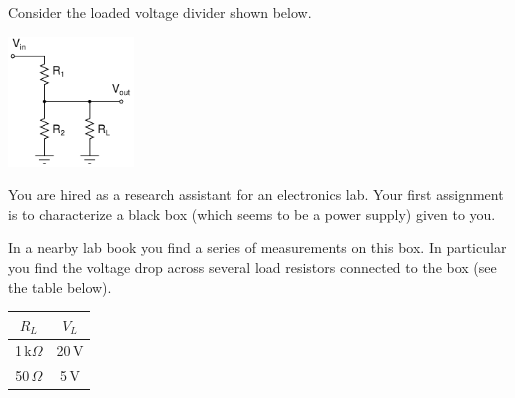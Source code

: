 \documentclass[letterpaper,addpoints,answers]{exam}
\begin{document}
\begin{questions}

\question

Consider the loaded voltage divider shown below.
\begin{center}
 \includegraphics[width=0.25\textwidth]{./schematics/loaded_voltage_divider}
\end{center}


\pagebreak

\question

You are hired as a research assistant for an electronics lab. Your first
assignment is to characterize a black box (which seems to be a power
supply) given to you.

In a nearby lab book you find a series of measurements on this box.
In particular you find the voltage drop across several load resistors
connected to the box (see the table below).

\begin{center}
 \begin{tabular}{|c|c|}
  \hline
   $R_L$         &  $V_L$ \\ 
  \hline
   1\,k$\Omega$  &  20\,V \\
   50\,$\Omega$  &  5\,V  \\
  \hline
 \end{tabular}
\end{center}
 

\end{questions}
\end{document}
